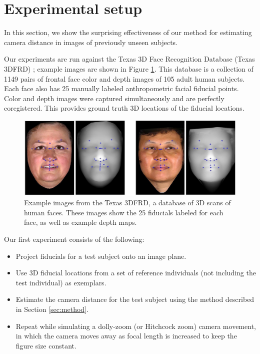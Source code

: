 \documentclass[runningheads]{llncs}
\begin{document}
\section{Experimental setup} \label{sec:experiments}
In this section, we show the surprising effectiveness of our method for estimating camera distance in images of previously unseen subjects.

Our experiments are run against the Texas 3D Face Recognition Database (Texas 3DFRD) \cite{gupta2010texas}; example images are shown in Figure \ref{fig:t3dfrd}.  
This database is a collection of 1149 pairs of frontal face color and depth images of 105 adult human subjects.  
Each face also has 25 manually labeled anthropometric facial fiducial points.  
Color and depth images were captured simultaneously and are perfectly coregistered.  
This provides ground truth 3D locations of the fiducial locations.  

\begin{figure}[h]
\centering
\includegraphics[width=1\linewidth]{resources/figures/t3dfr.jpg}
\caption{
Example images from the Texas 3DFRD, a database of 3D scans of human faces.
These images show the 25 fiducials labeled for each face, as well as example depth maps.
}
\label{fig:t3dfrd}
\end{figure}

Our first experiment consists of the following:
\begin{itemize}
\item Project fiducials for a test subject onto an image plane.
\item Use 3D fiducial locations from a set of reference individuals (not including the test individual) as exemplars.
\item Estimate the camera distance for the test subject using the method described in Section \ref{sec:method}.
\item Repeat while simulating a dolly-zoom (or Hitchcock zoom) camera movement, in which the camera moves away as focal length is increased to keep the figure size constant.
\end{itemize}
\end{document}

